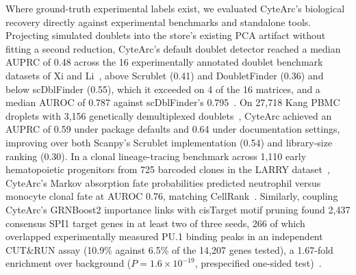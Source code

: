 Where ground-truth experimental labels exist, we evaluated CyteArc's biological recovery directly against experimental benchmarks and standalone tools. Projecting simulated doublets into the store's existing PCA artifact without fitting a second reduction, CyteArc's default doublet detector reached a median AUPRC of 0.48 across the 16 experimentally annotated doublet benchmark datasets of Xi and Li~\cite{xi2021doublets}, above Scrublet (0.41) and DoubletFinder (0.36) and below scDblFinder (0.55), which it exceeded on 4 of the 16 matrices, and a median AUROC of 0.787 against scDblFinder's 0.795~\cite{wolock2019scrublet,mcginnis2019doubletfinder,germain2022scdblfinder}. On 27,718 Kang PBMC droplets with 3,156 genetically demultiplexed doublets~\cite{kang2018}, CyteArc achieved an AUPRC of 0.59 under package defaults and 0.64 under documentation settings, improving over both Scanpy's Scrublet implementation (0.54) and library-size ranking (0.30). In a clonal lineage-tracing benchmark across 1,110 early hematopoietic progenitors from 725 barcoded clones in the LARRY dataset~\cite{weinreb2020}, CyteArc's Markov absorption fate probabilities predicted neutrophil versus monocyte clonal fate at AUROC 0.76, matching CellRank~\cite{weiler2024}. Similarly, coupling CyteArc's GRNBoost2 importance links with cisTarget motif pruning found 2,437 consensus SPI1 target genes in at least two of three seeds, 266 of which overlapped experimentally measured PU.1 binding peaks in an independent CUT\&RUN assay (10.9\% against 6.5\% of the 14,207 genes tested), a 1.67-fold enrichment over background ($P = 1.6\times 10^{-19}$, prespecified one-sided test)~\cite{aibar2017scenic,oki2018chipatlas}.

\label{note:Integration and mapping agreement}

